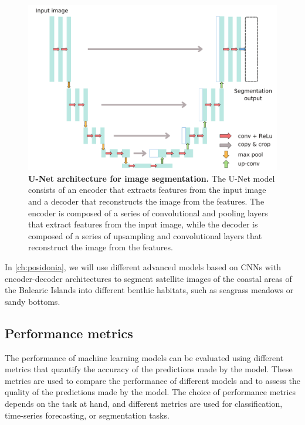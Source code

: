 \begin{figure}[H]
  \centering
  \includegraphics[width=1\textwidth]{Figures/Unet.pdf}
  \caption[U-Net architecture for image segmentation]{
    \textbf{U-Net architecture for image segmentation.} The U-Net model
    consists of an encoder that extracts features from the input image and a
    decoder that reconstructs the image from the features. The encoder is
    composed of a series of convolutional and pooling layers that extract
    features from the input image, while the decoder is composed of a series
    of
    upsampling and convolutional layers that reconstruct the image from the
    features.}
  \label{fig:Unet}
\end{figure}

In \cref{ch:posidonia}, we will use different advanced models based on CNNs
with encoder-decoder architectures to segment satellite images of the coastal
areas of the Balearic Islands into different benthic habitats, such as
seagrass meadows or sandy bottoms.

\subsection{Performance metrics}

The performance of machine learning models can be evaluated using different
metrics that quantify the accuracy of the predictions made by the model.
These
metrics are used to compare the performance of different models and to assess
the quality of the predictions made by the model. The choice of performance
metrics depends on the task at hand, and different metrics are used for
classification, time-series forecasting, or segmentation tasks.

